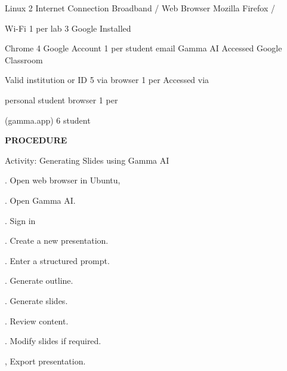 \documentclass[10pt,a4paper]{article}
\begin{document}
\noindent Linux 2                                Internet Connection Broadband /   Web Browser Mozilla Firefox /\par
\noindent Wi-Fi 1 per lab 3                 Google Installed\par

\noindent Chrome 4              Google Account         1 per student email   Gamma AI Accessed     Google Classroom\par
\noindent Valid institution or   ID 5                  via browser 1 per     Accessed via\par
\noindent personal                                     student               browser 1 per\par
\noindent (gamma.app) 6         student\par

\medskip\noindent\textbf{PROCEDURE}\par
\noindent Activity: Generating Slides using Gamma AI\par
{}. Open web browser in Ubuntu,\par
{}. Open Gamma AI.\par
{}. Sign in\par
{}. Create a new presentation.\par
{}. Enter a structured prompt.\par
{}. Generate outline.\par
{}. Generate slides.\par
{}. Review content.\par
{}. Modify slides if required.\par
{}, Export presentation.\par
\end{document}
